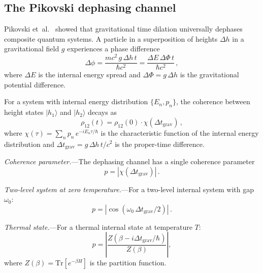 \documentclass[aps,prd,preprint,superscriptaddress,longbibliography]{revtex4-2}
\newcommand{\Tr}{\mathrm{Tr}}
\newcommand{\ket}[1]{|#1\rangle}
\begin{document}
\subsection{The Pikovski dephasing channel}

Pikovski et~al.~\cite{Pikovski2015} showed that gravitational time
dilation universally dephases composite quantum systems.  A particle
in a superposition of heights $\Delta h$ in a gravitational field
$g$ experiences a phase difference
\begin{equation}
  \Delta\phi = \frac{m c^2\,g\,\Delta h\,t}{\hbar c^2}
  = \frac{\Delta E\,\Delta\Phi\,t}{\hbar c^2}\,,
  \label{eq:Pikovski_phase}
\end{equation}
where $\Delta E$ is the internal energy spread and
$\Delta\Phi = g\,\Delta h$ is the gravitational potential difference.

For a system with internal energy distribution $\{E_n, p_n\}$, the
coherence between height states $\ket{h_1}$ and $\ket{h_2}$ decays as
\begin{equation}
  \rho_{12}(t) = \rho_{12}(0)\cdot\chi(\Delta t_{\mathrm{grav}})\,,
  \label{eq:coherence_decay}
\end{equation}
where $\chi(\tau) = \sum_n p_n\,e^{-i E_n \tau/\hbar}$ is the
characteristic function of the internal energy distribution and
$\Delta t_{\mathrm{grav}} = g\,\Delta h\,t/c^2$ is the
proper-time difference.

\emph{Coherence parameter.}---The dephasing channel has a single
coherence parameter
\begin{equation}
  p = |\chi(\Delta t_{\mathrm{grav}})|\,.
  \label{eq:p_coherence}
\end{equation}

\emph{Two-level system at zero temperature.}---For a two-level
internal system with gap $\omega_0$:
\begin{equation}
  p = |\cos(\omega_0\,\Delta t_{\mathrm{grav}}/2)|\,.
  \label{eq:p_2level}
\end{equation}

\emph{Thermal state.}---For a thermal internal state at temperature $T$:
\begin{equation}
  p = \left|\frac{Z(\beta - i\Delta t_{\mathrm{grav}}/\hbar)}{Z(\beta)}\right|,
  \label{eq:p_thermal}
\end{equation}
where $Z(\beta) = \Tr[e^{-\beta H}]$ is the partition function.

\end{document}
